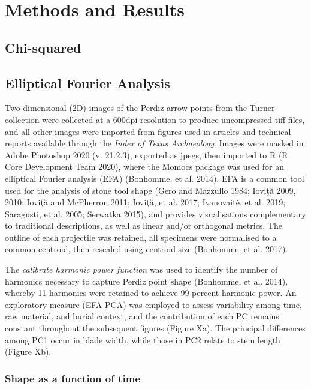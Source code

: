 \documentclass[review]{elsarticle}
\begin{document}
\section*{Methods and Results}

\subsection*{Chi-squared}

\subsection*{Elliptical Fourier Analysis}

Two-dimensional (2D) images of the Perdiz arrow points from the Turner collection were collected at a 600dpi resolution to produce uncompressed tiff files, and all other images were imported from figures used in articles and technical reports available through the \textit{Index of Texas Archaeology}. Images were masked in Adobe Photoshop 2020 (v. 21.2.3), exported as jpegs, then imported to R (R Core Development Team 2020), where the Momocs package was used for an elliptical Fourier analysis (EFA) (Bonhomme, et al. 2014). EFA is a common tool used for the analysis of stone tool shape (Gero and Mazzullo 1984; Ioviţă 2009, 2010; Ioviţă and McPherron 2011; Ioviţă, et al. 2017; Ivanovaitė, et al. 2019; Saragusti, et al. 2005; Serwatka 2015), and provides visualisations complementary to traditional descriptions, as well as linear and/or orthogonal metrics. The outline of each projectile was retained, all specimens were normalised to a common centroid, then rescaled using centroid size (Bonhomme, et al. 2017). 

The \textit{calibrate harmonic power function} was used to identify the number of harmonics necessary to capture Perdiz point shape (Bonhomme, et al. 2014), whereby 11 harmonics were retained to achieve 99 percent harmonic power. An exploratory measure (EFA-PCA) was employed to assess variability among time, raw material, and burial context, and the contribution of each PC remains constant throughout the subsequent figures (Figure Xa). The principal differences among PC1 occur in blade width, while those in PC2 relate to stem length (Figure Xb). 

\subsubsection*{Shape as a function of time}
\end{document}
